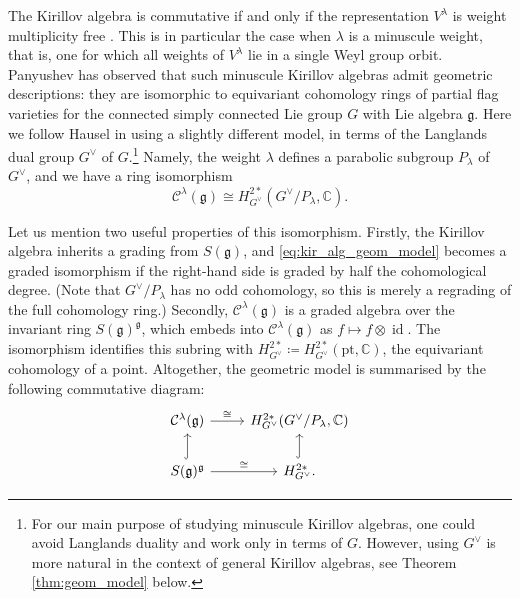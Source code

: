 \documentclass{amsart}
\newcommand{\C}{\mathbb{C}}
\newcommand{\Kir}{\mathcal{C}}
\newcommand{\g}{\mathfrak{g}}
\newcommand{\id}{\operatorname{id}}
\newcommand{\pt}{\text{pt}}
\theoremstyle{definition}
\theoremstyle{plain}
\theoremstyle{remark}
\begin{document}
The Kirillov algebra is commutative if and only if the representation $V^\lambda$ is weight multiplicity free \cite[Cor.\,1]{Kirillov2001_introduction}. This is in particular the case when $\lambda$ is a minuscule weight, that is, one for which all weights of $V^\lambda$ lie in a single Weyl group orbit. Panyushev \cite{Panyushev2004_endoj} has observed that such minuscule Kirillov algebras admit geometric descriptions: they are isomorphic to equivariant cohomology rings of partial flag varieties for the connected simply connected Lie group $G$ with Lie algebra $\g$. Here we follow Hausel \cite{Hausel2024_avatars} in using a slightly different model, in terms of the Langlands dual group $G^\vee$ of $G$.\footnote{For our main purpose of studying minuscule Kirillov algebras, one could avoid Langlands duality and work only in terms of $G$. However, using $G^\vee$ is more natural in the context of general Kirillov algebras, see Theorem \ref{thm:geom_model} below.} Namely, the weight $\lambda$ defines a parabolic subgroup $P_\lambda$ of $G^\vee$, and we have a ring isomorphism
\begin{equation}
\label{eq:kir_alg_geom_model}
    \Kir^\lambda(\g) \cong H^{2*}_{G^\vee}(G^\vee/P_\lambda, \C).
\end{equation}

Let us mention two useful properties of this isomorphism. Firstly, the Kirillov algebra inherits a grading from $S(\g)$, and \eqref{eq:kir_alg_geom_model} becomes a graded isomorphism if the right-hand side is graded by half the cohomological degree. (Note that $G^\vee/P_\lambda$ has no odd cohomology, so this is merely a regrading of the full cohomology ring.) Secondly, $\Kir^\lambda(\g)$ is a graded algebra over the invariant ring $S(\g)^\g$, which embeds into $\Kir^\lambda(\g)$ as $f\mapsto f\otimes \id$. The isomorphism identifies this subring with $H^{2*}_{G^\vee}\coloneqq H^{2*}_{G^\vee}(\pt, \C)$, the equivariant cohomology of a point. Altogether, the geometric model is summarised by the following commutative diagram:
\begin{equation}
\label{eq:geom_model_diag}
\begin{tikzcd}
    \Kir^\lambda(\g)
        \arrow[r, "\cong"]
    & H^{2*}_{G^\vee}(G^\vee/P_\lambda,\C) \\
    S(\g)^\g
        \arrow[u, hook]
        \arrow[r, "\cong"]
    & H^{2*}_{G^\vee}.
        \arrow[u, hook]
\end{tikzcd}
\end{equation}
\end{document}
